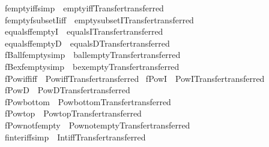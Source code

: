 \begin{isabellebody}
\isamarkupfalse%
\ fempty{\isacharunderscore}iff{\isacharbrackleft}simp{\isacharbrackright}\ {\isacharequal}\ empty{\isacharunderscore}iff{\isacharbrackleft}Transfer{\isachardot}transferred{\isacharbrackright}\isanewline
{}\isamarkupfalse%
\ fempty{\isacharunderscore}fsubsetI{\isacharbrackleft}iff{\isacharbrackright}\ {\isacharequal}\ empty{\isacharunderscore}subsetI{\isacharbrackleft}Transfer{\isachardot}transferred{\isacharbrackright}\isanewline
{}\isamarkupfalse%
\ equalsffemptyI\ {\isacharequal}\ equals{}I{\isacharbrackleft}Transfer{\isachardot}transferred{\isacharbrackright}\isanewline
{}\isamarkupfalse%
\ equalsffemptyD\ {\isacharequal}\ equals{}D{\isacharbrackleft}Transfer{\isachardot}transferred{\isacharbrackright}\isanewline
{}\isamarkupfalse%
\ fBall{\isacharunderscore}fempty{\isacharbrackleft}simp{\isacharbrackright}\ {\isacharequal}\ ball{\isacharunderscore}empty{\isacharbrackleft}Transfer{\isachardot}transferred{\isacharbrackright}\isanewline
{}\isamarkupfalse%
\ fBex{\isacharunderscore}fempty{\isacharbrackleft}simp{\isacharbrackright}\ {\isacharequal}\ bex{\isacharunderscore}empty{\isacharbrackleft}Transfer{\isachardot}transferred{\isacharbrackright}\isanewline
{}\isamarkupfalse%
\ fPow{\isacharunderscore}iff{\isacharbrackleft}iff{\isacharbrackright}\ {\isacharequal}\ Pow{\isacharunderscore}iff{\isacharbrackleft}Transfer{\isachardot}transferred{\isacharbrackright}\isanewline
{}\isamarkupfalse%
\ fPowI\ {\isacharequal}\ PowI{\isacharbrackleft}Transfer{\isachardot}transferred{\isacharbrackright}\isanewline
{}\isamarkupfalse%
\ fPowD\ {\isacharequal}\ PowD{\isacharbrackleft}Transfer{\isachardot}transferred{\isacharbrackright}\isanewline
{}\isamarkupfalse%
\ fPow{\isacharunderscore}bottom\ {\isacharequal}\ Pow{\isacharunderscore}bottom{\isacharbrackleft}Transfer{\isachardot}transferred{\isacharbrackright}\isanewline
{}\isamarkupfalse%
\ fPow{\isacharunderscore}top\ {\isacharequal}\ Pow{\isacharunderscore}top{\isacharbrackleft}Transfer{\isachardot}transferred{\isacharbrackright}\isanewline
{}\isamarkupfalse%
\ fPow{\isacharunderscore}not{\isacharunderscore}fempty\ {\isacharequal}\ Pow{\isacharunderscore}not{\isacharunderscore}empty{\isacharbrackleft}Transfer{\isachardot}transferred{\isacharbrackright}\isanewline
{}\isamarkupfalse%
\ finter{\isacharunderscore}iff{\isacharbrackleft}simp{\isacharbrackright}\ {\isacharequal}\ Int{\isacharunderscore}iff{\isacharbrackleft}Transfer{\isachardot}transferred{\isacharbrackright}\isanewline

\end{isabellebody}
